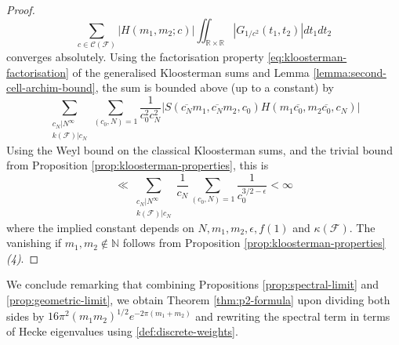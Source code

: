 \documentclass{article}
\numberwithin{equation}{section}
\begin{document}
\begin{proof}
    \begin{equation}
        {\sum_{c \in \mathcal{C}(\mathcal{F})}}|H(m_1,m_2;c)|\iint_{\mathbb{R}\times \mathbb{R}}|G_{1/c^2}(t_1,t_2)|dt_1dt_2
    \end{equation}
    converges absolutely. Using the factorisation property \eqref{eq:kloosterman-factorisation} of the generalised Kloosterman sums and Lemma \ref{lemma:second-cell-archim-bound}, the sum is bounded above (up to a constant) by
    \begin{equation}
        \sum_{\substack{c_N | N^\infty \\ k(\mathcal{F})|c_N}}\sum_{(c_0,N)=1}\frac{1}{c_0^2c_N^2}|S(\overline{c_N}m_1,\overline{c_N}m_2,c_0)H(m_1\overline{c_0},m_2\overline{c_0},c_N)|
    \end{equation}
Using the Weyl bound on the classical Kloosterman sums, and the trivial bound from Proposition \ref{prop:kloosterman-properties}, this is 
\begin{equation}
    \ll \sum_{\substack{c_N | N^\infty \\ k(\mathcal{F})|c_N}}\frac{1}{c_N}\sum_{(c_0,N)=1}\frac{1}{c_0^{3/2-\epsilon}}< \infty
\end{equation}
where the implied constant depends on $N, m_1,m_2,\epsilon, f(1)$ and $\kappa(\mathcal{F})$. The vanishing if $m_1,m_2 \not \in \mathbb{N}$ follows from Proposition \ref{prop:kloosterman-properties} \emph{(4)}.
    
\end{proof}

We conclude remarking that combining Propositions \ref{prop:spectral-limit} and \ref{prop:geometric-limit}, we obtain Theorem \ref{thm:p2-formula} upon dividing both sides by $16\pi^2(m_1m_2)^{1/2}e^{-2\pi(m_1+m_2)}$ and rewriting the spectral term in terms of Hecke eigenvalues using \eqref{def:discrete-weights}.

\pagebreak
\printbibliography
\end{document}
